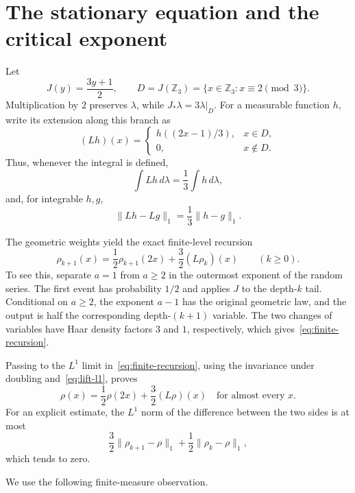 \documentclass[11pt]{article}
\theoremstyle{remark}
\newcommand{\Zthree}{\mathbb Z_3}
\newcommand{\norm}[2]{\lVert #1\rVert_{#2}}
\begin{document}
\section{The stationary equation and the critical exponent}

Let
\[
  J(y)=\frac{3y+1}{2},\qquad
  D=J(\Zthree)=\{x\in\Zthree:x\equiv2\pmod3\}.
\]
Multiplication by \(2\) preserves \(\lambda\), while
\(J_*\lambda=3\lambda|_D\).  For a measurable function \(h\),
write its extension along this branch as
\[
  (Lh)(x)=
  \begin{cases}
    h((2x-1)/3),&x\in D,\\
    0,&x\notin D.
  \end{cases}
\]
Thus, whenever the integral is defined,
\begin{equation}\label{eq:lift-integral}
  \int Lh\,d\lambda=\frac13\int h\,d\lambda,
\end{equation}
and, for integrable \(h,g\),
\begin{equation}\label{eq:lift-l1}
  \norm{Lh-Lg}{1}=\frac13\norm{h-g}{1}.
\end{equation}

The geometric weights yield the exact finite-level recursion
\begin{equation}\label{eq:finite-recursion}
  \rho_{k+1}(x)
   =\frac12\rho_{k+1}(2x)+\frac32(L\rho_k)(x)
       \qquad(k\geq0).
\end{equation}
To see this, separate \(a=1\) from \(a\geq2\) in the outermost
exponent of the random series.  The first event has probability
\(1/2\) and applies \(J\) to the depth-\(k\) tail.  Conditional
on \(a\geq2\), the exponent \(a-1\) has the original geometric
law, and the output is half the corresponding depth-\((k+1)\)
variable.  The two changes of variables have Haar density factors
\(3\) and \(1\), respectively, which gives~\eqref{eq:finite-recursion}.

Passing to the \(L^1\) limit in~\eqref{eq:finite-recursion}, using
the invariance under doubling and~\eqref{eq:lift-l1}, proves
\begin{equation}\label{eq:stationary-density}
  \rho(x)=\frac12\rho(2x)+\frac32(L\rho)(x)
       \quad\text{for almost every }x.
\end{equation}
For an explicit estimate, the \(L^1\) norm of the difference between
the two sides is at most
\[
  \frac32\norm{\rho_{k+1}-\rho}{1}
  +\frac12\norm{\rho_k-\rho}{1},
\]
which tends to zero.

We use the following finite-measure observation.
\end{document}
